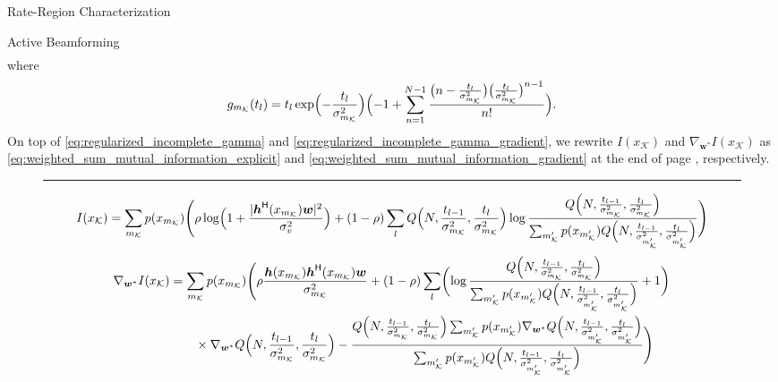 \begin{section}{Rate-Region Characterization}
\begin{subsection}{Active Beamforming}
\begin{align}
		\end{align}
		where
		\begin{equation}
			g_{m_{\mathcal{K}}}(t_l) = t_l\exp\Bigl(-\frac{t_l}{\sigma_{m_{\mathcal{K}}}^2}\Bigr)\Bigl(-1+\sum_{n=1}^{N-1} \frac{\bigl(n - \frac{t_l}{\sigma_{m_{\mathcal{K}}}^2}\bigr) \bigl(\frac{t_l}{\sigma_{m_{\mathcal{K}}}^2}\bigr)^{n-1}}{n!}\Bigr).
			\label{eq:regularized_incomplete_gamma_gradient_component}
		\end{equation}
		On top of \eqref{eq:regularized_incomplete_gamma} and \eqref{eq:regularized_incomplete_gamma_gradient}, we rewrite $I(x_{\mathcal{K}})$ and $\nabla_{\boldsymbol{w}^*} I(x_{\mathcal{K}})$ as \eqref{eq:weighted_sum_mutual_information_explicit} and \eqref{eq:weighted_sum_mutual_information_gradient} at the end of page \pageref{eq:weighted_sum_mutual_information_explicit}, respectively.
		\begin{figure*}[!b]
			\hrule
			\begin{equation}
				I(x_{\mathcal{K}})=\sum_{m_{\mathcal{K}}}p(x_{m_{\mathcal{K}}})\Biggl(\rho\log\Bigl(1+\frac{\lvert\boldsymbol{h}^\mathsf{H}(x_{m_{\mathcal{K}}})\boldsymbol{w}\rvert^2}{\sigma_v^2}\Bigr)+(1-\rho)\sum_l Q\Bigl(N,\frac{t_{l-1}}{\sigma_{m_{\mathcal{K}}}^2},\frac{t_l}{\sigma_{m_{\mathcal{K}}}^2}\Bigr) \log \frac{Q\Bigl(N,\frac{t_{l-1}}{\sigma_{m_{\mathcal{K}}}^2},\frac{t_l}{\sigma_{m_{\mathcal{K}}}^2}\Bigr)}{\sum_{m_{\mathcal{K}}'} p(x_{m_{\mathcal{K}}'}) Q\Bigl(N,\frac{t_{l-1}}{\sigma_{m_{\mathcal{K}}'}^2},\frac{t_l}{\sigma_{m_{\mathcal{K}}'}^2}\Bigr)}\Biggr)
				\label{eq:weighted_sum_mutual_information_explicit}
			\end{equation}
			\begin{align}
				\nabla_{\boldsymbol{w}^*} I(x_{\mathcal{K}})
				 & = \sum_{m_{\mathcal{K}}}p(x_{m_{\mathcal{K}}})\Biggl(\rho\frac{\boldsymbol{h}(x_{m_{\mathcal{K}}})\boldsymbol{h}^\mathsf{H}(x_{m_{\mathcal{K}}})\boldsymbol{w}}{\sigma_{m_{\mathcal{K}}}^2}+(1-\rho)\sum_l\biggl(\log\frac{Q\Bigl(N,\frac{t_{l-1}}{\sigma_{m_{\mathcal{K}}}^2},\frac{t_l}{\sigma_{m_{\mathcal{K}}}^2}\Bigr)}{\sum_{m_{\mathcal{K}}'}p(x_{m_{\mathcal{K}}'})Q\Bigl(N,\frac{t_{l-1}}{\sigma_{m_{\mathcal{K}}'}^2},\frac{t_l}{\sigma_{m_{\mathcal{K}}'}^2}\Bigr)}+1\biggr)\nonumber                                                                                   \\
				 & \qquad \times \nabla_{\boldsymbol{w}^*} Q\Bigl(N,\frac{t_{l-1}}{\sigma_{m_{\mathcal{K}}}^2},\frac{t_l}{\sigma_{m_{\mathcal{K}}}^2}\Bigr)-\frac{Q\Bigl(N,\frac{t_{l-1}}{\sigma_{m_{\mathcal{K}}}^2},\frac{t_l}{\sigma_{m_{\mathcal{K}}}^2}\Bigr)\sum_{m_{\mathcal{K}}'}p(x_{m_{\mathcal{K}}'})\nabla_{\boldsymbol{w}^*}Q\Bigl(N,\frac{t_{l-1}}{\sigma_{m_{\mathcal{K}}'}^2},\frac{t_l}{\sigma_{m_{\mathcal{K}}'}^2}\Bigr)}{\sum_{m_{\mathcal{K}}'}p(x_{m_{\mathcal{K}}'})Q\Bigl(N,\frac{t_{l-1}}{\sigma_{m_{\mathcal{K}}'}^2},\frac{t_l}{\sigma_{m_{\mathcal{K}}'}^2}\Bigr)}\Biggr)

\end{align}
\end{figure*}
\end{subsection}
\end{section}
